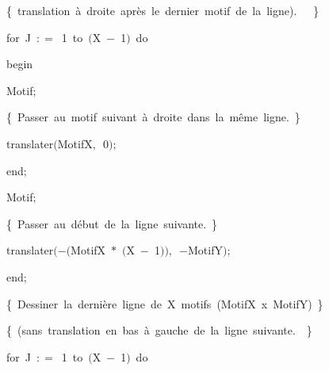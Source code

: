 {\vspace{\neglskip}\mbox{\blc  \blk\blk\blk\blk\idt  \cmt  \{\ translation\ à\ droite\ après\ le\ dernier\ motif\ de\ la\ ligne).\ \ \ \}\idt }\par 
\pagebreak[3] 
\vspace{\neglskip}\mbox{\blc  \blk\blk\blk\blk\idt  \mcl for\idt \ J\ $:$$=$\ 1\ \mcl to\idt \ $($X\ $-$\ 1$)$\ \mcl do\idt }\par 
\vspace{\neglskip}\mbox{\blc  \blk\blk\blk\blk\blk\idt  \mcl begin\idt }\par 
\vspace{\neglskip}\mbox{\blc  \blk\blk\blk\blk\blk\blk\idt  Motif$;$}\par 
\vspace{\neglskip}\mbox{\blc  \blk\blk\blk\blk\blk\blk\idt  \cmt  \{\ Passer\ au\ motif\ suivant\ à\ droite\ dans\ la\ même\ ligne.\ \}\idt }\par 
\vspace{\neglskip}\mbox{\blc  \blk\blk\blk\blk\blk\blk\idt  translater$($MotifX$,$\ 0$)$$;$}\par 
\vspace{\neglskip}\mbox{\blc  \blk\blk\blk\blk\blk\idt  \mcl end\idt $;$}\par 
\vspace{\neglskip}\mbox{\blc  \blk\blk\blk\blk\idt  Motif$;$}\par 
\vspace{\neglskip}\mbox{\blc  \blk\blk\blk\blk\idt  \cmt  \{\ Passer\ au\ début\ de\ la\ ligne\ suivante.\ \}\idt }\par 
\vspace{\neglskip}\mbox{\blc  \blk\blk\blk\blk\idt  translater$($$-$$($MotifX\ $\ast$\ $($X\ $-$\ 1$)$$)$$,$\ $-$MotifY$)$$;$}\par 
\vspace{\neglskip}\mbox{\blc  \blk\blk\blk\idt  \mcl end\idt $;$}\par 
\vspace{\neglskip}\mbox{\blc  \blk\blk\blk\idt  \cmt  \{\ Dessiner\ la\ dernière\ ligne\ de\ X\ motifs\ (MotifX\ x\ MotifY)\ \}\idt \ }\par 
\vspace{\neglskip}\mbox{\blc  \blk\blk\blk\idt  \cmt  \{\ (sans\ translation\ en\ bas\ à\ gauche\ de\ la\ ligne\ suivante.\ \ \}\idt }\par 
\pagebreak[3] 
\vspace{\neglskip}\mbox{\blc  \blk\blk\blk\idt  \mcl for\idt \ J\ $:$$=$\ 1\ \mcl to\idt \ $($X\ $-$\ 1$)$\ \mcl do\idt }\par 
}
